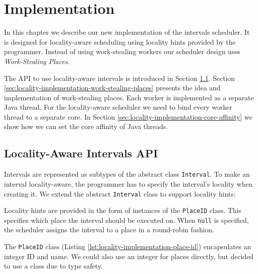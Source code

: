
\chapter{Implementation}
\label{chap:locality-implementation}

In this chapter we describe our new implementation of the intervals
scheduler. It is designed for locality-aware scheduling using locality
hints provided by the programmer. Instead of using work-stealing
workers our scheduler design uses \emph{Work-Stealing Places}. 

The API to use locality-aware intervals is introduced in Section
\ref{sec:locality-implementation-locality-aware-intervals-api}. Section
\ref{sec:locality-implementation-work-stealing-places} presents the
idea and implementation of work-stealing places. Each worker is
implemented as a separate Java thread. For the locality-aware
scheduler we need to bind every worker thread to a separate core. In
Section \ref{sec:locality-implementation-core-affinity} we show how we
can set the core affinity of Java threads.


\section{Locality-Aware Intervals API}
\label{sec:locality-implementation-locality-aware-intervals-api}

Intervals are represented as subtypes of the abstract class
\lstinline!Interval!. To make an interval locality-aware, the
programmer has to specify the interval's locality when creating it. We
extend the abstract \lstinline!Interval! class to support locality
hints:



Locality hints are provided in the form of instances of the
\lstinline!PlaceID! class. This specifies which
place the interval should be executed on. When \lstinline!null! is
specified, the scheduler assigns the interval to a place in a
round-robin fashion.

The \lstinline!PlaceID! class (Listing
\ref{lst:locality-implementation-place-id}) encapsulates an integer ID
and name. We could also use an integer for places directly, but
decided to use a class due to type safety.

